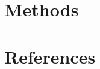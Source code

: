 \documentclass{i7-thesis}
\begin{document}


\maketitle

%
%
\acresetall
\cleardoublepage
\tableofcontents
\cleardoublepage
{}










\chapter{Methods}














\cleardoublepage

\clearpage

\chapter{References}
\listoffigures
\clearpage
\clearpage


\end{document}
